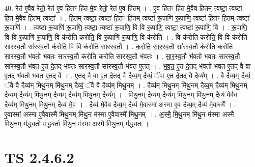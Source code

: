\documentclass[17pt]{extarticle}
\begin{document}
40. रेत॑ ए॒वैव रेतो॒ रेत॑ ए॒व हि॒तꣳ हि॒त मे॒व रेतो॒ रेत॑ ए॒व हि॒तम् । . ए॒व हि॒तꣳ हि॒त मे॒वैव हि॒तम् त्वष्टा॒ त्वष्टा॑ हि॒त मे॒वैव हि॒तम् त्वष्टा᳚ । . हि॒तम् त्वष्टा॒ त्वष्टा॑ हि॒तꣳ हि॒तम् त्वष्टा॑ रू॒पाणि॑ रू॒पाणि॒ त्वष्टा॑ हि॒तꣳ हि॒तम् त्वष्टा॑ रू॒पाणि॑ । . त्वष्टा॑ रू॒पाणि॑ रू॒पाणि॒ त्वष्टा॒ त्वष्टा॑ रू॒पाणि॒ वि वि रू॒पाणि॒ त्वष्टा॒ त्वष्टा॑ रू॒पाणि॒ वि । . रू॒पाणि॒ वि वि रू॒पाणि॑ रू॒पाणि॒ वि क॑रोति करोति॒ वि रू॒पाणि॑ रू॒पाणि॒ वि क॑रोति । . वि क॑रोति करोति॒ वि वि क॑रोति सारस्व॒तौ सा॑रस्व॒तौ क॑रोति॒ वि वि क॑रोति सारस्व॒तौ । . क॒रो॒ति॒ सा॒र॒स्व॒तौ सा॑रस्व॒तौ क॑रोति करोति सारस्व॒तौ भ॑वतो भवतः सारस्व॒तौ क॑रोति करोति सारस्व॒तौ भ॑वतः । . सा॒र॒स्व॒तौ भ॑वतो भवतः सारस्व॒तौ सा॑रस्व॒तौ भ॑वत ए॒त दे॒तद् भ॑वतः सारस्व॒तौ सा॑रस्व॒तौ भ॑वत ए॒तत् । . भ॒व॒त॒ ए॒त दे॒तद् भ॑वतो भवत ए॒तद् वै वा ए॒तद् भ॑वतो भवत ए॒तद् वै । . ए॒तद् वै वा ए॒त दे॒तद् वै दैव्य॒म् दैव्यं॒ ॅवा ए॒त दे॒तद् वै दैव्य᳚म् । . वै दैव्य॒म् दैव्यं॒ ॅवै वै दैव्य॑म् मिथु॒नम् मि॑थु॒नम् दैव्यं॒ ॅवै वै दैव्य॑म् मिथु॒नम् । . दैव्य॑म् मिथु॒नम् मि॑थु॒नम् दैव्य॒म् दैव्य॑म् मिथु॒नम् दैव्य॒म् दैव्य॑म् मिथु॒नम् दैव्य॒म् दैव्य॑म् मिथु॒नम् दैव्य᳚म् । . मि॒थु॒नम् दैव्य॒म् दैव्य॑म् मिथु॒नम् मि॑थु॒नम् दैव्य॑ मे॒वैव दैव्य॑म् मिथु॒नम् मि॑थु॒नम् दैव्य॑ मे॒व । . दैव्य॑ मे॒वैव दैव्य॒म् दैव्य॑ मे॒वास्मा॑ अस्मा ए॒व दैव्य॒म् दैव्य॑ मे॒वास्मै᳚ । . ए॒वास्मा॑ अस्मा ए॒वैवास्मै॑ मिथु॒नम् मि॑थु॒न म॑स्मा ए॒वैवास्मै॑ मिथु॒नम् । . अ॒स्मै॒ मि॒थु॒नम् मि॑थु॒न म॑स्मा अस्मै मिथु॒नम् म॑द्ध्य॒तो म॑द्ध्य॒तो मि॑थु॒न म॑स्मा अस्मै मिथु॒नम् म॑द्ध्य॒तः । \newline
\pagebreak
{}

\section{ TS 2.4.6.2 }
\end{document}
